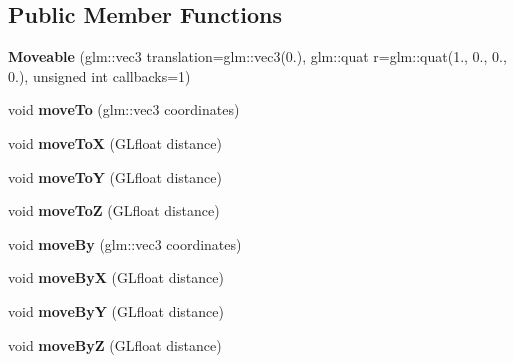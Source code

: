 \subsection*{Public Member Functions}
\begin{DoxyCompactItemize}
\item 
\mbox{\label{classflw_1_1flf_1_1Moveable_a26c2d581d689904237a49cb2b50abc6d}} 
{\bfseries Moveable} (glm\+::vec3 translation=glm\+::vec3(0.), glm\+::quat r=glm\+::quat(1., 0., 0., 0.), unsigned int callbacks=1)
\item 
\mbox{\label{classflw_1_1flf_1_1Moveable_a67fbd8b45d4087f1aff3fb873684e6ca}} 
void {\bfseries move\+To} (glm\+::vec3 coordinates)
\item 
\mbox{\label{classflw_1_1flf_1_1Moveable_a0c02748df9356f869305c0253e0c31fd}} 
void {\bfseries move\+ToX} (G\+Lfloat distance)
\item 
\mbox{\label{classflw_1_1flf_1_1Moveable_ace70342b30fdf0954e75d5bd04074c60}} 
void {\bfseries move\+ToY} (G\+Lfloat distance)
\item 
\mbox{\label{classflw_1_1flf_1_1Moveable_a4a7158c63dbe20ec6bdddbcacbe7cef8}} 
void {\bfseries move\+ToZ} (G\+Lfloat distance)
\item 
\mbox{\label{classflw_1_1flf_1_1Moveable_aaff5a1860e9a194a429db36ae3c0c4d4}} 
void {\bfseries move\+By} (glm\+::vec3 coordinates)
\item 
\mbox{\label{classflw_1_1flf_1_1Moveable_ad181d788d972de663a04c2fd5b533f31}} 
void {\bfseries move\+ByX} (G\+Lfloat distance)
\item 
\mbox{\label{classflw_1_1flf_1_1Moveable_a40893a5b81ede99c80f246a225894058}} 
void {\bfseries move\+ByY} (G\+Lfloat distance)
\item 
\mbox{\label{classflw_1_1flf_1_1Moveable_a1dd0a73b9aa2c7bba7d25dde46568c0f}} 
void {\bfseries move\+ByZ} (G\+Lfloat distance)

\end{DoxyCompactItemize}
